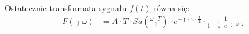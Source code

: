 \begin{task}
Ostatecznie transformata sygnału $f(t)$ równa się:
\begin{align*}
F(\jmath\omega) &=A \cdot T \cdot Sa\left(\frac{\omega \cdot T}{2}\right) \cdot e^{-\jmath \cdot \omega \cdot \frac{T}{2}} \cdot \frac{1}{1 - \frac{1}{2}\cdot e^{-\jmath \cdot \omega \cdot T}}
\end{align*}

\end{task}

